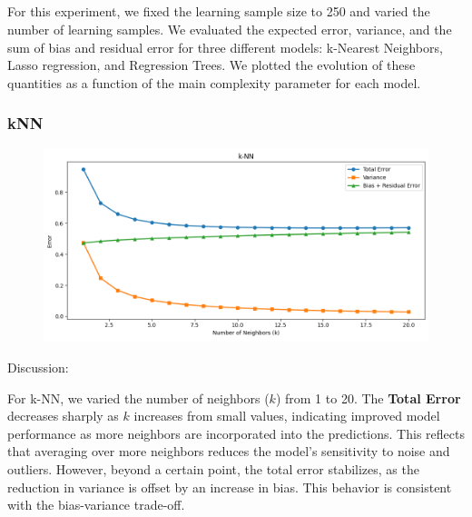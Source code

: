 \documentclass[a4paper,10pt]{article}
\begin{document}
\newpage
\subsection{}

For this experiment, we fixed the learning sample size to 250 and varied the number of learning samples. We evaluated the expected error, variance, and the sum of bias and residual error for three different models: k-Nearest Neighbors, Lasso regression, and Regression Trees. We plotted the evolution of these quantities as a function of the main complexity parameter for each model.

\subsubsection{kNN}

\begin{figure}[H]
    \centering
    \includegraphics[width=1\linewidth]{aaaa.png}
\end{figure}

Discussion:

For k-NN, we varied the number of neighbors (\(k\)) from 1 to 20. The \textbf{Total Error} decreases sharply as \(k\) increases from small values, indicating improved model performance as more neighbors are incorporated into the predictions. This reflects that averaging over more neighbors reduces the model’s sensitivity to noise and outliers. However, beyond a certain point, the total error stabilizes, as the reduction in variance is offset by an increase in bias. This behavior is consistent with the bias-variance trade-off.\\
\end{document}
